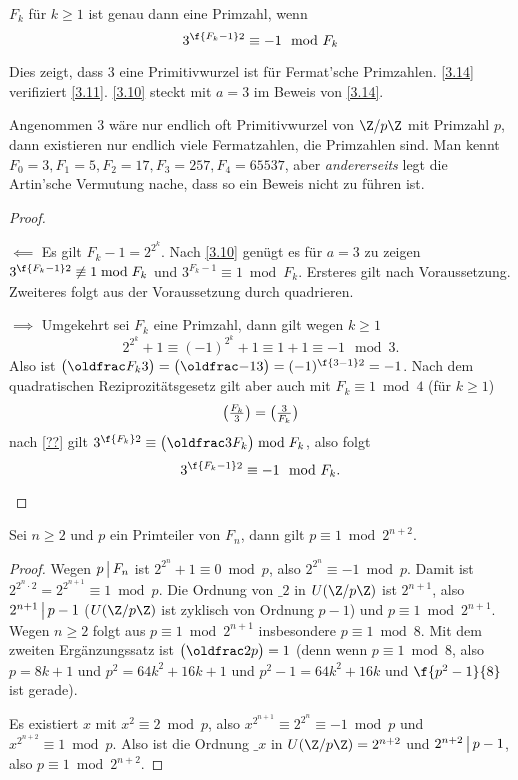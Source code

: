 \begin{st} \label{3.14}
	$F_k$ für $k \ge 1$ ist genau dann eine Primzahl, wenn
	\[
		3^{\f{F_k - 1}2} \equiv -1 \mod F_k
	\]
	\begin{note}
		Dies zeigt, dass $3$ eine Primitivwurzel ist für Fermat'sche Primzahlen.
		\ref{3.14} verifiziert \ref{3.11}.
		\ref{3.10} steckt mit $a = 3$ im Beweis von \ref{3.14}.

		Angenommen $3$ wäre nur endlich oft Primitivwurzel von $\Z / p\Z$ mit Primzahl $p$, dann existieren nur endlich viele Fermatzahlen, die Primzahlen sind.
		Man kennt $F_0 = 3, F_1 = 5, F_2 = 17, F_3 = 257, F_4 = 65537$, aber \emph{andererseits} legt die Artin'sche Vermutung nache, dass so ein Beweis nicht zu führen ist.
	\end{note}
	\begin{proof}
		\begin{segnb}{$\impliedby$}
			Es gilt $F_k - 1 = 2^{2^k}$.
			Nach \ref{3.10} genügt es für $a = 3$ zu zeigen $3^{\f{F_k - 1}2} \not\equiv 1 \bmod F_k$ und $3^{F_k-1} \equiv 1 \bmod F_k$.
			Ersteres gilt nach Voraussetzung.
			Zweiteres folgt aus der Voraussetzung durch quadrieren.
		\end{segnb}
		\begin{segnb}{$\implies$}
			Umgekehrt sei $F_k$ eine Primzahl, dann gilt wegen $k \ge 1$
			\[
				2^{2^k} + 1
				\equiv (-1)^{2^k} + 1
				\equiv 1 + 1
				\equiv -1
				\mod 3.
			\]
			Also ist $\legsym{F_k}{3} = \legsym{-1}{3} = (-1)^{\f{3-1}2} = -1$.
			Nach dem quadratischen Reziprozitätsgesetz gilt aber auch mit $F_k \equiv 1 \bmod 4$ (für $k \ge 1$)
			\[
				\legsym{F_k}{3}
				= \legsym{3}{F_k}
			\]
			nach \ref{??} gilt $3^{\f{F_k}2} \equiv \legsym{3}{F_k} \bmod F_k$, also folgt
			\[
				3^{\f{F_k-1}2} \equiv -1 \mod F_k.
			\]
		\end{segnb}
	\end{proof}
\end{st}

\begin{st} \label{3.15}
	Sei $n \ge 2$ und $p$ ein Primteiler von $F_n$, dann gilt $p \equiv 1 \bmod 2^{n+2}$.
	\begin{proof}
		Wegen $p \divs F_n$ ist $2^{2^n} + 1 \equiv 0 \bmod p$, also $2^{2^n} \equiv - 1 \bmod p$.
		Damit ist $2^{2^n \cdot 2} = 2^{2^{n+1}} \equiv 1 \bmod p$.
		Die Ordnung von $\_ 2$ in $U(\Z / p\Z)$ ist $2^{n+1}$, also $2^{n+1} \divs p - 1$ ($U(\Z / p\Z)$ ist zyklisch von Ordnung $p-1$) und $p \equiv 1 \bmod 2^{n+1}$.
		Wegen $n \ge 2$ folgt aus $p \equiv 1 \bmod 2^{n+1}$ insbesondere $p \equiv 1 \bmod 8$.
		Mit dem zweiten Ergänzungssatz ist $\legsym{2}{p} = 1$ (denn wenn $p \equiv 1 \bmod 8$, also $p = 8k + 1$ und $p^2 = 64k^2 + 16k + 1$ und $p^2 - 1 = 64k^2 + 16k$ und $\f{p^2 - 1}{8}$ ist gerade).

		Es existiert $x$ mit $x^2 \equiv 2 \bmod p$, also $x^{2^{n+1}} \equiv 2^{2^n} \equiv -1 \bmod p$ und $x^{2^{n+2}} \equiv 1 \bmod p$.
		Also ist die Ordnung $\_ x$ in $U(\Z / p\Z) = 2^{n+2}$ und $2^{n+2} \divs p-1$, also $p \equiv 1 \bmod 2^{n+2}$.
	\end{proof}
\end{st}

